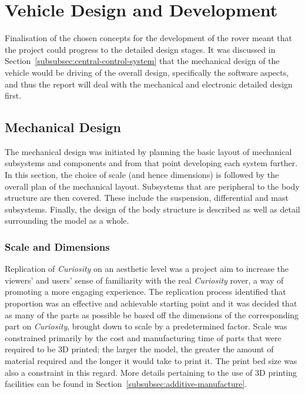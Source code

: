 \section{Vehicle Design and Development}
\label{sec:detailedDesign}
  Finalisation of the chosen concepts for the development of the rover meant that the project could progress to the detailed design stages. It was discussed in Section~\ref{subsubsec:central-control-system} that the mechanical design of the vehicle would be driving of the overall design, specifically the software aspects, and thus the report will deal with the mechanical and electronic detailed design first.
  
  \subsection{Mechanical Design}
    The mechanical design was initiated by planning the basic layout of mechanical subsystems and components and from that point developing each system further. In this section, the choice of scale (and hence dimensions) is followed by the overall plan of the mechanical layout. Subsystems that are peripheral to the body structure are then covered. These include the suspension, differential and mast subsystems. Finally, the design of the body structure is described as well as detail surrounding the model as a whole.
    
    \subsubsection{Scale and Dimensions}
      Replication of \textit{Curiosity} on an aesthetic level was a project aim to increase the viewers' and users' sense of familiarity with the real \textit{Curiosity} rover, a way of promoting a more engaging experience. The replication process identified that proportion was an effective and achievable starting point and it was decided that as many of the parts as possible be based off the dimensions of the corresponding part on \textit{Curiosity}, brought down to scale by a predetermined factor. Scale was constrained primarily by the cost and manufacturing time of parts that were required to be 3D printed; the larger the model, the greater the amount of material required and the longer it would take to print it. The print bed size was also a constraint in this regard. More details pertaining to the use of 3D printing facilities can be found in Section~\ref{subsubsec:additive-manufacture}.
      
